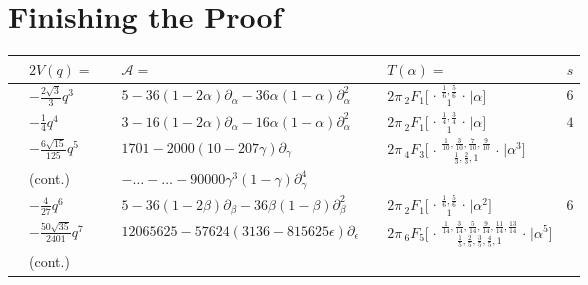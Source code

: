 \documentclass[nofootinbib,preprint]{revtex4-1}
\renewcommand{\arraystretch}{1.3}
\begin{document}
\section{Finishing the Proof}
\begin{table}[t]
\begin{center}
\label{tab:Hyperelliptic}
{\renewcommand{\arraystretch}{2}%
\begin{tabularx}{\textwidth}{ c l | c l | c l | c }
\hline \hline
\hspace{0.1cm} & 
$2V(q)=$ & \hspace{0.1cm} 
& $\mathcal{A}=$\hspace{7cm} &\hspace{0.1cm} & $T(\alpha)=$ & \;\;$s$\; \\
\hline
& $-\frac{2\sqrt{3}}{3}q^3$ \hspace{0.5cm} & &
$5 - 36 (1 - 2 \alpha)\partial_{\alpha}- 36  \alpha(1 - \alpha)\partial_{\alpha}^2$   & &
$2\pi\,_2F_1 \Big[ \genfrac..{0pt}{}{
\frac{1}{6},\frac{5}{6}
}{1}\Big| \alpha \Big]$  & $6$    \\
& $-\frac{1}{4}q^4$  & &
$3 - 16 (1 - 2 \alpha)\partial_{\alpha}- 16  \alpha(1 - \alpha)\partial_{\alpha}^2$   & &
$2\pi\,_2F_1 \Big[ \genfrac..{0pt}{}{
\frac{1}{4},\frac{3}{4}
}{1}\Big| \alpha  \Big]$  & $4$   \\
& $-\frac{6\sqrt{15}}{125}q^5$  & &
$1701 - 2000 (10 - 207 \gamma)\partial_{\gamma}$ 
  & &
$2\pi\,_4F_3 \Big[ \genfrac..{0pt}{}{
\frac{1}{10},\frac{3}{10},\frac{7}{10},\frac{9}{10}
}{\frac{1}{3},\frac{2}{3},1}\Big| \alpha^3 \Big]$ &     \\
& \;\;\;\tiny(cont.)  & & \hspace{0.5cm}
$-\ldots - \ldots - 90000 \gamma^3 (1 - \gamma) \partial_{\gamma}^4 $
  & & &     \\
& $-\frac{4}{27}q^6$  & &
$5 - 36 (1 - 2 \beta)\partial_{\beta}- 36\beta(1 - \beta)\partial_{\beta}^2$  & &
$2\pi\,_2F_1 \Big[ \genfrac..{0pt}{}{
\frac{1}{6},\frac{5}{6}
}{1}\Big| \alpha^2 \Big]$    & $6$  \\
& $-\frac{50\sqrt{35}}{2401}q^7$  & &
$12065625 - 57624 (3136 - 815625 \epsilon)\partial_{\epsilon}$  & &
$2\pi\,_6F_5 \Big[ \genfrac..{0pt}{}{
\frac{1}{14},\frac{3}{14},\frac{5}{14},\frac{9}{14},\frac{11}{14},\frac{13}{14}
}{\frac{1}{5},\frac{2}{5},\frac{3}{5},\frac{4}{5},1}\Big| \alpha^5 \Big]$ \;    \\
& \;\;\;\tiny(cont.)  & & \hspace{0.5cm}

\end{tabularx}}
\end{center}
\end{table}
\end{document}
